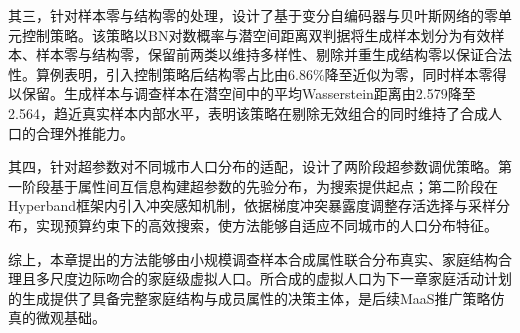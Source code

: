 其三，针对样本零与结构零的处理，设计了基于变分自编码器与贝叶斯网络的零单元控制策略。该策略以BN对数概率与潜空间距离双判据将生成样本划分为有效样本、样本零与结构零，保留前两类以维持多样性、剔除并重生成结构零以保证合法性。算例表明，引入控制策略后结构零占比由6.86\%降至近似为零，同时样本零得以保留。生成样本与调查样本在潜空间中的平均Wasserstein距离由2.579降至2.564，趋近真实样本内部水平，表明该策略在剔除无效组合的同时维持了合成人口的合理外推能力。

其四，针对超参数对不同城市人口分布的适配，设计了两阶段超参数调优策略。第一阶段基于属性间互信息构建超参数的先验分布，为搜索提供起点；第二阶段在Hyperband框架内引入冲突感知机制，依据梯度冲突暴露度调整存活选择与采样分布，实现预算约束下的高效搜索，使方法能够自适应不同城市的人口分布特征。

综上，本章提出的方法能够由小规模调查样本合成属性联合分布真实、家庭结构合理且多尺度边际吻合的家庭级虚拟人口。所合成的虚拟人口为下一章家庭活动计划的生成提供了具备完整家庭结构与成员属性的决策主体，是后续MaaS推广策略仿真的微观基础。
